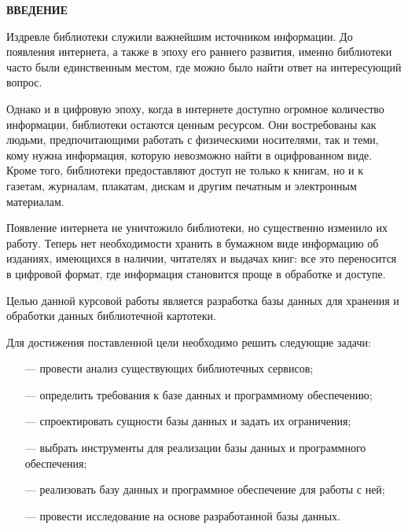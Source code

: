 \begin{center}
    \textbf{ВВЕДЕНИЕ}
\end{center}

Издревле библиотеки служили важнейшим источником информации. До появления интернета, а также в эпоху его раннего развития, именно библиотеки часто были единственным местом, где можно было найти ответ на интересующий вопрос.

Однако и в цифровую эпоху, когда в интернете доступно огромное количество информации, библиотеки остаются ценным ресурсом. Они востребованы как людьми, предпочитающими работать с физическими носителями, так и теми, кому нужна информация, которую невозможно найти в оцифрованном виде. Кроме того, библиотеки предоставляют доступ не только к книгам, но и к газетам, журналам, плакатам, дискам и другим печатным и электронным материалам.

Появление интернета не уничтожило библиотеки, но существенно изменило их работу. Теперь нет необходимости хранить в бумажном виде информацию об изданиях, имеющихся в наличии, читателях и выдачах книг: все это переносится в цифровой формат, где информация становится проще в обработке и доступе.

Целью данной курсовой работы является разработка базы данных для хранения и обработки данных библиотечной картотеки.

Для достижения поставленной цели необходимо решить следующие задачи:

\begin{itemize}
	\item[---] провести анализ существующих библиотечных сервисов;
	\item[---] определить требования к базе данных и программному обеспечению;
	\item[---] спроектировать сущности базы данных и задать их ограничения;  
	\item[---] выбрать инструменты для реализации базы данных и программного обеспечения;  
	\item[---] реализовать базу данных и программное обеспечение для работы с ней;  
	\item[---] провести исследование на основе разработанной базы данных.
\end{itemize}	
 